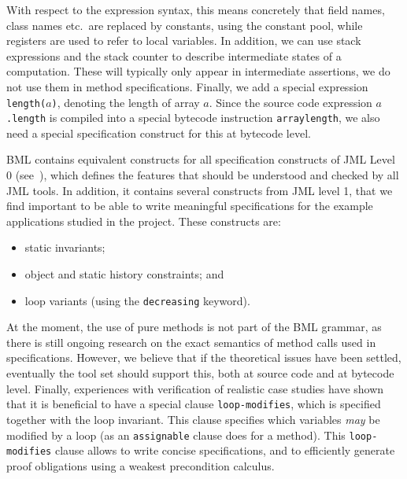 \documentclass[a4paper]{llncs}
\begin{document}
With respect to the expression syntax, this means concretely that
field names, class names etc.\ are replaced by constants, using
the constant pool, while registers are used to refer to local
variables. In addition, we can use stack expressions and the stack
counter to describe intermediate states of a computation. These will
typically only appear in intermediate assertions, we do not use them
in method specifications. Finally, we add a special expression
\texttt{length(\(a\))}, denoting the length of array \(a\). Since the 
source code expression \texttt{\(a\).length} is compiled into a
special bytecode instruction \texttt{arraylength}, we also need a
special specification construct for this at bytecode level.

BML contains equivalent constructs for all specification constructs of
JML Level 0 (see~\cite[\S2.9]{JMLReferenceManual05}), which defines
the features that should be understood and checked by all JML
tools. In addition, it contains several constructs from JML level 1,
that we find important to be able to write meaningful specifications
for the example applications studied in the \mobius project. These
constructs are:
\begin{itemize}
\item static invariants;
\item object and static history constraints; and 
\item loop variants (using the \texttt{decreasing} keyword).
\end{itemize}

At the moment, the use of pure methods is not part of the BML grammar,
as there is still ongoing research on the exact semantics of method
calls used in specifications. However, we believe that if the
theoretical issues have been settled, eventually the
\mobius tool set should support this, both at source code and at 
bytecode level. Finally, experiences with verification of realistic case
studies have shown that it is beneficial to have a special clause
\texttt{loop-modifies}, which is specified together with the loop
invariant. This clause specifies which variables
\emph{may} be modified by a loop (as an \texttt{assignable} clause does
for a method). This \texttt{loop-modifies} clause allows to write
concise specifications, and to efficiently generate proof obligations
using a weakest precondition calculus.
\end{document}
